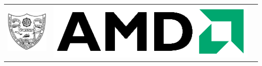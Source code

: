 \documentclass[a4paper,12pt]{report}
\begin{document}
\begin{titlepage}
\begin{center}
\begin{table}[H]
\begin{tabular}{ccc}
        \hspace{.5cm}  \begin{minipage}{.5\textwidth}
      \includegraphics[width=0.85in, height=0.85in]{./figures/Surthkal_logo.eps}
    \end{minipage}
    &
    \begin{minipage}{.5\textwidth}
		\includegraphics[scale=0.6]{./figures/amd_logo.eps}
     \end{minipage}
      \end{tabular}
 \end{table}

%
\vspace{-0.25in}


\end{center}
\end{titlepage}
\end{document}
